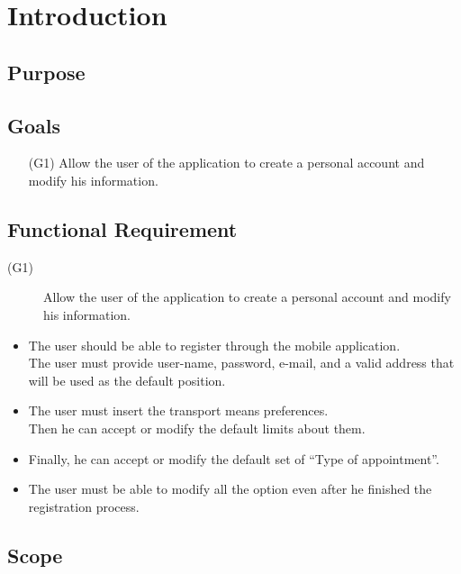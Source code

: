 \documentclass [12pt]{article}
\begin{document}
\clearpage

\tableofcontents

\section{Introduction}
\subsection{Purpose}
\subsection{Goals}
\begin{enumerate}
\item[(G1)]Allow the user of the application to create a personal account and modify his information.


\end{enumerate}
\subsection{Functional Requirement}
\begin{description}

\item[(G1)]Allow the user of the application to create a personal account and modify his information.
\end{description}
\begin{itemize}
\item The user should be able to register through the mobile application.\\
The user must provide user-name, password, e-mail, and a valid address that will be used as the default position.\\
\item The user must insert the transport means preferences.\\
Then he can accept or modify the default limits about them.\\
\item Finally, he can accept or modify the default set of “Type of appointment”.\\
\item The user must be able to modify all the option even after he finished the registration process.\\
\end{itemize}
\subsection{Scope}
\end{document}
